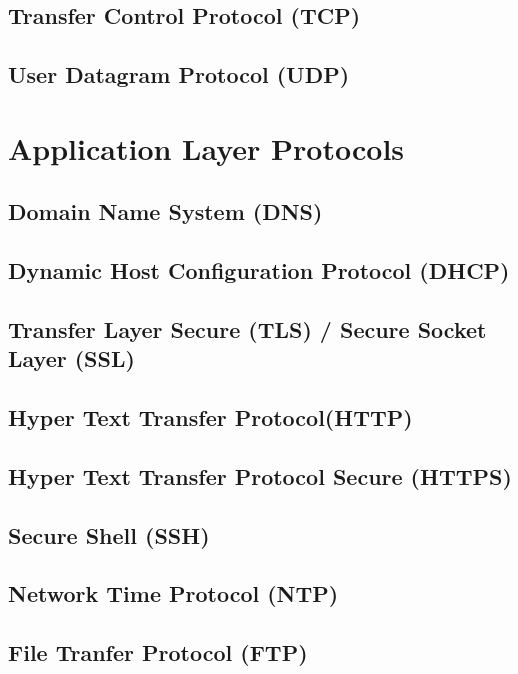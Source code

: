\documentclass{article}
\begin{document}
\subsection{Transfer Control Protocol (TCP)}

\subsection{User Datagram Protocol (UDP)}

\section{Application Layer Protocols}

\subsection{Domain Name System (DNS)}

\subsection{Dynamic Host Configuration Protocol (DHCP)}

\subsection{Transfer Layer Secure (TLS) / Secure Socket Layer (SSL)}

\subsection{Hyper Text Transfer Protocol(HTTP)}

\subsection{Hyper Text Transfer Protocol Secure (HTTPS)}

\subsection{Secure Shell (SSH)}

\subsection{Network Time Protocol (NTP)}

\subsection{File Tranfer Protocol (FTP)}
\end{document}
